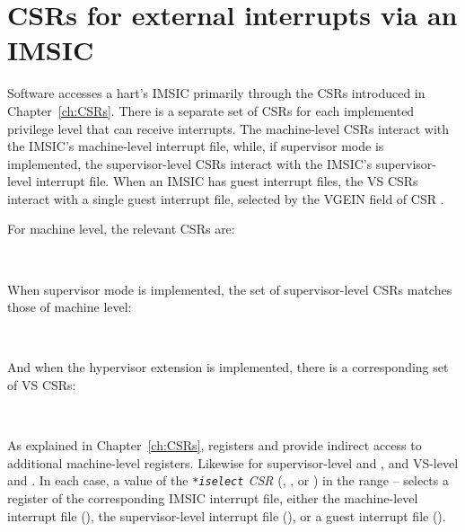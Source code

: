 \section{CSRs for external interrupts via an IMSIC}

Software accesses a hart's IMSIC primarily through the CSRs introduced
in Chapter~\ref{ch:CSRs}.
There is a separate set of CSRs for each implemented privilege level
that can receive interrupts.
The machine-level CSRs interact with the IMSIC's machine-level
interrupt file, while, if supervisor mode is implemented, the
supervisor-level CSRs interact with the IMSIC's supervisor-level
interrupt file.
When an IMSIC has guest interrupt files, the VS CSRs interact with a
single guest interrupt file, selected by the VGEIN field of CSR
.

For machine level, the relevant CSRs are:\nopagebreak
\begin{displayLinesTable}
 \qquad {} \qquad {} \\
\end{displayLinesTable}

When supervisor mode is implemented, the set of supervisor-level CSRs
matches those of machine level:
\begin{displayLinesTable}
 \qquad {} \qquad {} \\
\end{displayLinesTable}

And when the hypervisor extension is implemented, there is a
corresponding set of VS CSRs:
\begin{displayLinesTable}
 \qquad {} \qquad {} \\
\end{displayLinesTable}

As explained in Chapter~\ref{ch:CSRs}, registers  and
 provide indirect access to additional machine-level
registers.
Likewise for supervisor-level  and , and VS-level
 and .
In each case, a value of the \emph{\texttt{*iselect} CSR}
(, , or ) in the range
-- selects a register of the corresponding IMSIC
interrupt file, either the machine-level interrupt file (),
the supervisor-level interrupt file (), or a guest
interrupt file ().

